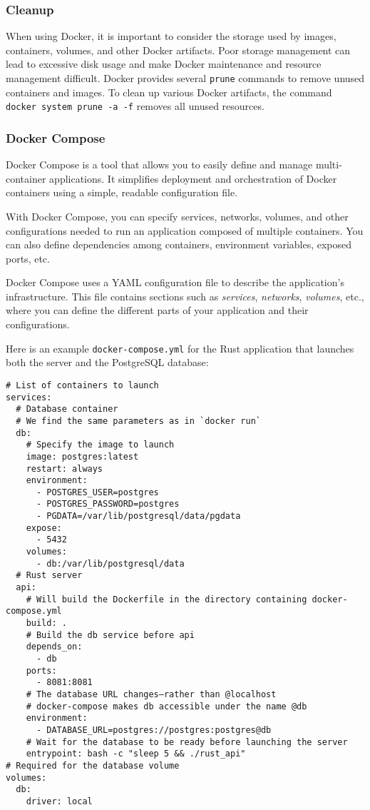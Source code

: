 \documentclass[french]{article}
\begin{document}
\subsubsection{Cleanup}

When using Docker, it is important to consider the storage used by images, containers, volumes, and other Docker artifacts.
Poor storage management can lead to excessive disk usage and make Docker maintenance and resource management difficult.
Docker provides several \texttt{prune} commands to remove unused containers and images.
To clean up various Docker artifacts, the command \texttt{docker system prune -a -f} removes all unused resources.

\subsubsection{Docker Compose}

Docker Compose is a tool that allows you to easily define and manage multi-container applications.
It simplifies deployment and orchestration of Docker containers using a simple, readable configuration file.

With Docker Compose, you can specify services, networks, volumes, and other configurations needed to run an application composed of multiple containers.
You can also define dependencies among containers, environment variables, exposed ports, etc.

Docker Compose uses a YAML configuration file to describe the application’s infrastructure.
This file contains sections such as \textit{services}, \textit{networks}, \textit{volumes}, etc., where you can define the different parts of your application and their configurations.

Here is an example \texttt{docker-compose.yml} for the Rust application that launches both the server and the PostgreSQL database:

\begin{lstlisting}
# List of containers to launch
services:
  # Database container
  # We find the same parameters as in `docker run`
  db:
    # Specify the image to launch
    image: postgres:latest
    restart: always
    environment:
      - POSTGRES_USER=postgres
      - POSTGRES_PASSWORD=postgres
      - PGDATA=/var/lib/postgresql/data/pgdata
    expose:
      - 5432
    volumes:
      - db:/var/lib/postgresql/data
  # Rust server
  api:
    # Will build the Dockerfile in the directory containing docker-compose.yml
    build: .
    # Build the db service before api
    depends_on:
      - db
    ports:
      - 8081:8081
    # The database URL changes—rather than @localhost
    # docker-compose makes db accessible under the name @db
    environment:
      - DATABASE_URL=postgres://postgres:postgres@db
    # Wait for the database to be ready before launching the server
    entrypoint: bash -c "sleep 5 && ./rust_api"
# Required for the database volume
volumes:
  db:
    driver: local
\end{lstlisting}
\end{document}
